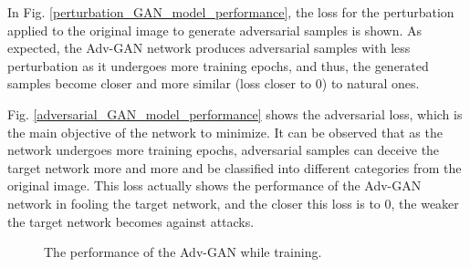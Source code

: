 \documentclass[lettersize,journal]{IEEEtran}
\begin{document}
In Fig. \ref{perturbation_GAN_model_performance}, the loss for the perturbation applied to the original image to generate adversarial samples is shown. As expected, the Adv-GAN network produces adversarial samples with less perturbation as it undergoes more training epochs, and thus, the generated samples become closer and more similar (loss closer to 0) to natural ones.

Fig. \ref{adversarial_GAN_model_performance} shows the adversarial loss, which is the main objective of the network to minimize. It can be observed that as the network undergoes more training epochs, adversarial samples can deceive the target network more and more and be classified into different categories from the original image. This loss actually shows the performance of the Adv-GAN network in fooling the target network, and the closer this loss is to 0, the weaker the target network becomes against attacks.

\begin{figure}[!t]
\centering
{}
\caption{The performance of the Adv-GAN while training.}
\end{figure}
\end{document}
